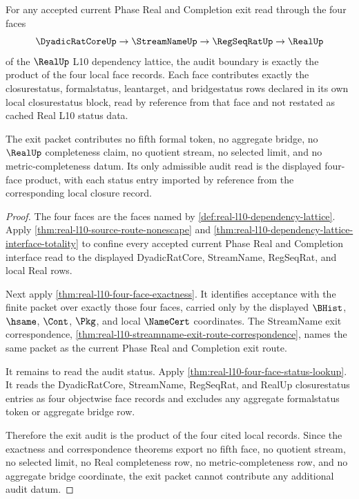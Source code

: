 \begin{theorem}
\label{thm:real-l10-current-phase-exit-audit-pullback}
For any accepted current Phase Real and Completion exit read through the four
faces
$$
\DyadicRatCoreUp \to \StreamNameUp \to \RegSeqRatUp \to \RealUp
$$
of the $\RealUp$ L10 dependency lattice, the audit boundary is exactly the
product of the four local face records. Each face contributes exactly the
closurestatus, formalstatus, leantarget, and bridgestatus rows declared in its
own local closurestatus block, read by reference from that face and not
restated as cached Real L10 status data.

The exit packet contributes no fifth formal token, no aggregate bridge, no
$\RealUp$ completeness claim, no quotient stream, no selected limit, and no
metric-completeness datum. Its only admissible audit read is the displayed
four-face product, with each status entry imported by reference from the
corresponding local closure record.
\end{theorem}
\begin{proof}
The four faces are the faces named by
\autoref{def:real-l10-dependency-lattice}. Apply
\autoref{thm:real-l10-source-route-nonescape} and
\autoref{thm:real-l10-dependency-lattice-interface-totality} to confine every
accepted current Phase Real and Completion interface read to the displayed
DyadicRatCore, StreamName, RegSeqRat, and local Real rows.

Next apply \autoref{thm:real-l10-four-face-exactness}. It identifies
acceptance with the finite packet over exactly those four faces, carried only
by the displayed $\BHist$, $\hsame$, $\Cont$, $\Pkg$, and local $\NameCert$
coordinates. The StreamName exit correspondence,
\autoref{thm:real-l10-streamname-exit-route-correspondence}, names the same
packet as the current Phase Real and Completion exit route.

It remains to read the audit status. Apply
\autoref{thm:real-l10-four-face-status-lookup}. It reads the DyadicRatCore,
StreamName, RegSeqRat, and RealUp closurestatus entries as four objectwise face
records and excludes any aggregate formalstatus token or aggregate bridge row.

Therefore the exit audit is the product of the four cited local records. Since
the exactness and correspondence theorems export no fifth face, no quotient
stream, no selected limit, no Real completeness row, no metric-completeness
row, and no aggregate bridge coordinate, the exit packet cannot contribute any
additional audit datum.
\end{proof}

